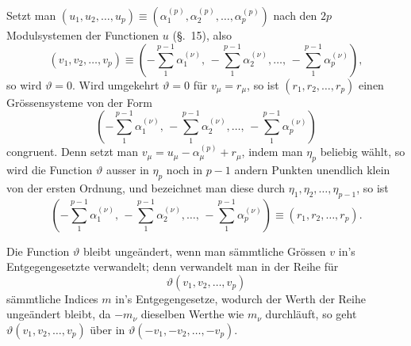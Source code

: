 \documentclass[a4paper,12pt,leqno]{article}
\begin{document}
\nobreak\medskip

Setzt man
$(u_1, u_2,\ldots, u_p)
   \equiv (\alpha_1^{(p)}, \alpha_2^{(p)},\ldots, \alpha_p^{(p)})$
nach den $2p$ Modulsystemen der Functionen $u$ (\S.~15), also
\[ (v_1, v_2,\ldots, v_p) \equiv
         \left(
          - \sum_1^{p-1} \alpha_1^{(\nu)}, \,
          - \sum_1^{p-1} \alpha_2^{(\nu)},\ldots, \,
          - \sum_1^{p-1} \alpha_p^{(\nu)}
         \right),\]
so wird $\vartheta = 0$.  Wird umgekehrt $\vartheta = 0$ f\"{u}r
$v_\mu = r_\mu$, so ist $(r_1, r_2,\ldots, r_p)$ einen
Gr\"{o}ssensysteme von der Form
\[       \left(
          - \sum_1^{p-1} \alpha_1^{(\nu)}, \,
          - \sum_1^{p-1} \alpha_2^{(\nu)},\ldots, \,
          - \sum_1^{p-1} \alpha_p^{(\nu)}
         \right) \]
congruent.  Denn setzt man
$v_\mu = u_\mu - \alpha_\mu^{(p)} + r_\mu$,
indem man $\eta_p$ beliebig w\"{a}hlt, so wird die Function
$\vartheta$ ausser in $\eta_p$ noch in $p - 1$ andern Punkten
unendlich klein von der ersten Ordnung, und bezeichnet man diese
durch $\eta_1, \eta_2,\ldots, \eta_{p-1}$, so ist
\[       \left(
          - \sum_1^{p-1} \alpha_1^{(\nu)}, \,
          - \sum_1^{p-1} \alpha_2^{(\nu)},\ldots, \,
          - \sum_1^{p-1} \alpha_p^{(\nu)}
         \right)
   \equiv (r_1, r_2,\ldots, r_p).\]

Die Function $\vartheta$ bleibt unge\"{a}ndert, wenn man
s\"{a}mmtliche Gr\"{o}ssen $v$ in's Entgegengesetzte verwandelt;
denn verwandelt man in der Reihe f\"{u}r
\[ \vartheta(v_1, v_2,\ldots, v_p) \]
s\"{a}mmtliche Indices $m$ in's Entgegengesetze, wodurch der
Werth der Reihe unge\"{a}ndert bleibt, da $- m_\nu$ dieselben
Werthe wie $m_\nu$ durchl\"{a}uft, so geht
$\vartheta(v_1, v_2,\ldots, v_p)$
\"{u}ber in
$\vartheta(-v_1, -v_2,\ldots, -v_p)$.
\end{document}
